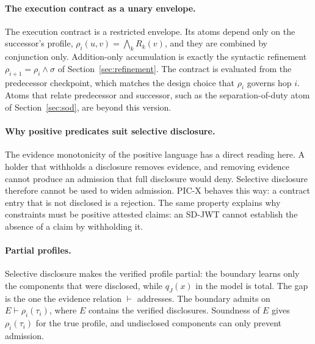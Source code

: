 \documentclass[10pt,twocolumn]{article}
\begin{document}
\paragraph{The execution contract as a unary envelope.}
The execution contract is a restricted envelope. Its atoms depend only on the
successor's profile, \(\rho_i(u,v)=\bigwedge_k R_k(v)\), and they are combined by
conjunction only. Addition-only accumulation is exactly the syntactic refinement
\(\rho_{i+1}=\rho_i\land\sigma\) of Section~\ref{sec:refinement}. The contract
is evaluated from the predecessor checkpoint, which matches the design choice
that \(\rho_i\) governs hop \(i\). Atoms that relate predecessor and successor,
such as the separation-of-duty atom of Section~\ref{sec:sod}, are beyond this
version.

\paragraph{Why positive predicates suit selective disclosure.}
The evidence monotonicity of the positive language has a direct reading here. A
holder that withholds a disclosure removes evidence, and removing evidence
cannot produce an admission that full disclosure would deny. Selective
disclosure therefore cannot be used to widen admission. PIC-X behaves this way:
a contract entry that is not disclosed is a rejection. The same property
explains why constraints must be positive attested claims: an SD-JWT cannot
establish the absence of a claim by withholding it.

\paragraph{Partial profiles.}
Selective disclosure makes the verified profile partial: the boundary learns
only the components that were disclosed, while \(q_J(x)\) in the model is total.
The gap is the one the evidence relation \(\vdash\) addresses. The boundary
admits on \(E\vdash\rho_i(\tau_i)\), where \(E\) contains the verified
disclosures. Soundness of \(E\) gives \(\rho_i(\tau_i)\) for the true profile,
and undisclosed components can only prevent admission.
\end{document}
